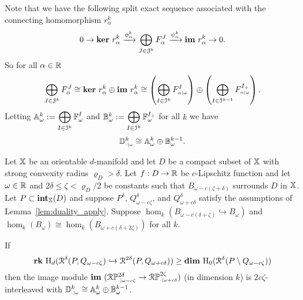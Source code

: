 Note that we have the following split exact sequence associated with the connecting homomorphism $r_\alpha^k$
\[ 0\to \mathbf{ker}~r_\alpha^k\xrightarrow{\phi_\alpha^k}\bigoplus_{J\in\mathcal{J}^k} F_\alpha^J\xrightarrow{\psi_\alpha^k}\mathbf{im}~r_\alpha^k\to 0.\]
So for all $\alpha\in\mathbb{R}$
\[ \bigoplus_{J\in\mathcal{J}^k} F_\alpha^J \cong \mathbf{ker}~r_\alpha^k\oplus \mathbf{im}~r_\alpha^k
  \cong\left(\bigoplus_{I\in\mathcal{I}^k} F_{\scriptscriptstyle \alpha\mid \omega}^I\right)\oplus\left(\bigoplus_{I\in\mathcal{I}^{k-1}} F_{\scriptscriptstyle \alpha\mid \omega}^{I_+}\right).\]
Letting $\mathbb{A}_\omega^k := \displaystyle\bigoplus_{I\in\mathcal{I}^k} \mathbb{F}_\omega^I$ and $\mathbb{B}_\omega^k := \displaystyle\bigoplus_{I\in\mathcal{I}^k} \mathbb{F}_\omega^{I_+}$ for all $k$ we have
\[ \mathbb{D}_{\scriptscriptstyle \cdot\mid \omega}^k \cong \mathbb{A}_\omega^k\oplus \mathbb{B}_\omega^{k-1}.\]%


\begin{theorem}%
  Let $\mathbb{X}$ be an orientable $d$-manifold and let $D$ be a compact subset of $\mathbb{X}$ with strong convexity radius $\varrho_D > \delta$.
  Let $f : D\to\mathbb{R}$ be $c$-Lipschitz function and let $\omega\in\mathbb{R}$ and $2\delta\leq\zeta < \varrho_D/2$ be constants such that $B_{\omega - c(\zeta +\delta)}$ surrounds $D$ in $\mathbb{X}$.
  Let $P\subset \mathbf{int}_{\mathbb{X}}(D)$ and suppose $P^\delta$, $Q_{\omega-c\zeta}^\delta$, and $Q_{\omega+c\delta}^\delta$ satisfy the assumptions of Lemma~\ref{lem:duality_apply}.
  Suppose $\hom_k(B_{\omega-c(\delta+\zeta)}\hookrightarrow B_\omega)$ and $\hom_k(B_\omega)\cong\hom_k(B_{\omega+c(\delta+2\zeta)})$ for all $k$.

  If
  \[\mathbf{rk}~\mathrm{H}_d(\mathcal{R}^\delta(P, Q_{\omega -c\zeta})\hookrightarrow \mathcal{R}^{2\delta}(P, Q_{\omega+c\delta})) \geq \mathbf{dim}~\mathrm{H}_0(\mathcal{R}^\delta(P\setminus Q_{\omega-c\zeta}))\]
  then the image module $\mathbf{im}~(\mathcal{R}\mathbb{P}_{\scriptscriptstyle \cdot\mid \omega-c\zeta}^{2\delta}\to \mathcal{R}\mathbb{P}_{\scriptscriptstyle \cdot\mid \omega+c\delta}^{2\zeta})$ (in dimension $k$) is $2c\zeta$-interleaved with $\mathbb{D}_{\scriptscriptstyle \cdot\mid \omega}^k \cong \mathbb{A}_\omega^k\oplus \mathbb{B}_\omega^{k-1}$.
\end{theorem}

